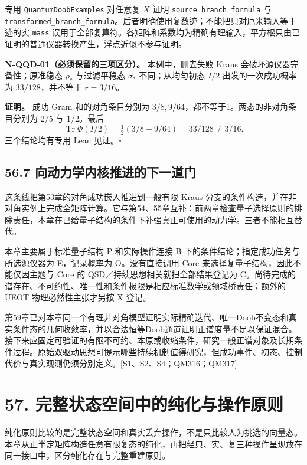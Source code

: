 \documentclass[
  11pt,
  oneside]{book}
\begin{document}
专用 \texttt{Quantum\allowbreak Doob\allowbreak Examples} 对任意复 \(X\) 证明
\texttt{source\_\allowbreak branch\_\allowbreak formula} 与
\texttt{transformed\_\allowbreak branch\_\allowbreak formula}。后者明确使用复数迹；不能把只对厄米输入等于迹的实
\texttt{mass}
误用于全部复算符。各矩阵和系数均为精确有理输入，平方根只由已证明的普通仪器转换产生，浮点近似不参与证明。

\protect\hypertarget{n-qqd-01}{}{}

\textbf{N-QQD-01（必须保留的三项区分）。} 本例中，删去失败 Kraus
会破坏源仪器完备性；原准稳态 \(\rho_*\) 与过滤平稳态 \(\sigma_*\)
不同；从均匀初态 \(I/2\) 出发的一次成功概率为 \(33/128\)，并不等于
\(r=3/16\)。

\textbf{证明。} 成功 Gram 和的对角条目分别为
\(3/8,9/64\)，都不等于1。两态的非对角条目分别为 \(2/5\) 与 \(1/2\)。最后
\[
\operatorname{Tr}\Phi(I/2)=\tfrac12(3/8+9/64)=33/128\ne3/16.
\] 三个结论均有专用 Lean 见证。\(\square\)

\section{56.7 向动力学内核推进的下一道门}

这条线把第53章的对角成功嵌入推进到一般有限 Kraus
分支的条件构造，并在非对角实例上完成全矩阵计算。它与第54、55章互补：前两章检查量子选择原则的排除责任，本章在已给量子结构的条件下补强真正可使用的动力学。三者不能相互替代。

本章主要属于标准量子结构 P 和实际操作连接 B
下的条件结论；指定成功任务与所选源仪器为 E，记录概率为 O。没有直接调用
Core 来选择复量子结构，因此不能仅因主题与 Core 的
QSD／持续思想相关就把全部结果登记为
C。尚待完成的谱存在、不可约性、唯一性和条件极限是相应标准数学或领域桥责任；额外的
UEOT 物理必然性主张才另按 X 登记。

第59章已对本章同一个有理非对角模型证明实际精确迭代、唯一Doob不变态和真实条件态的几何收敛率，并以合法恒等Doob通道证明正谱度量不足以保证混合。接下来应固定可验证的有限不可约、本原或收缩条件，研究一般正谱对象及长期条件过程。原始双驱动思想可提示哪些持续机制值得研究，但成功事件、初态、控制代价与真实观测仍须分别定义。{[}S1、S2、S4；QM316；QM317{]}

\chapter{57. 完整状态空间中的纯化与操作原则}\label{ch-57}\hypertarget{ch-57}{}

纯化原则比较的是完整状态空间和真实丢弃操作，不是只比较人为挑选的向量态。本章从正半定矩阵构造任意有限复态的纯化，再把经典、实、复三种操作呈现放在同一接口中，区分纯化存在与完整重建原则。
\end{document}
